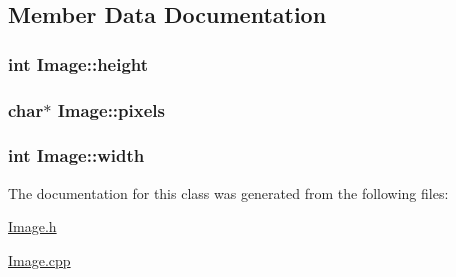\subsection{Member Data Documentation}
\hypertarget{classImage_a51df43db420c9c0b57536cb2dd36de5c}{
\subsubsection[{height}]{\setlength{\rightskip}{0pt plus 5cm}int Image\+::height}}\label{classImage_a51df43db420c9c0b57536cb2dd36de5c}
\hypertarget{classImage_a6afbcf4b0a2774f020ce350bff9d0d6c}{
\subsubsection[{pixels}]{\setlength{\rightskip}{0pt plus 5cm}char$\ast$ Image\+::pixels}}\label{classImage_a6afbcf4b0a2774f020ce350bff9d0d6c}
\hypertarget{classImage_ab8d12f635013c04159cd4d3d972bac88}{
\subsubsection[{width}]{\setlength{\rightskip}{0pt plus 5cm}int Image\+::width}}\label{classImage_ab8d12f635013c04159cd4d3d972bac88}


The documentation for this class was generated from the following files\+:\begin{DoxyCompactItemize}
\item 
\hyperlink{Image_8h}{Image.\+h}\item 
\hyperlink{Image_8cpp}{Image.\+cpp}\end{DoxyCompactItemize}

